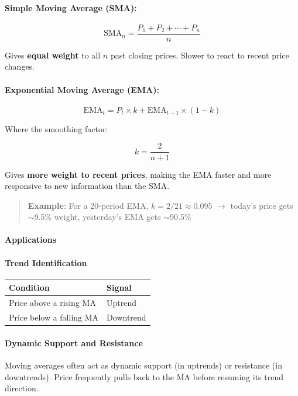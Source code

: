 \documentclass[12pt,openany]{book}
\begin{document}
\paragraph{Simple Moving Average (SMA):}

\[
\text{SMA}_n = \frac{P_1 + P_2 + \cdots + P_n}{n}
\]

Gives \textbf{equal weight} to all \(n\) past closing prices. Slower to react to recent price changes.

\paragraph{Exponential Moving Average (EMA):}

\[
\text{EMA}_t = P_t \times k + \text{EMA}_{t-1} \times (1 - k)
\]

Where the smoothing factor:

\[
k = \frac{2}{n + 1}
\]

Gives \textbf{more weight to recent prices}, making the EMA faster and more responsive to new information than the SMA.

\begin{quote}
\textbf{Example}: For a 20-period EMA, \(k = 2/21 \approx 0.095\) \(\rightarrow\) today's price gets \(\sim\)9.5\% weight, yesterday's EMA gets \(\sim\)90.5\%

\end{quote}
\paragraph{Applications}

\paragraph{Trend Identification}

\begin{center}
\small
\renewcommand{\arraystretch}{1.2}
\begin{tabular}{|L{0.30\textwidth}|L{0.60\textwidth}|}
\hline
 \textbf{Condition} & \textbf{Signal} \\ \hline
 Price above a rising MA & Uptrend \\ \hline
 Price below a falling MA & Downtrend \\ \hline
\end{tabular}
\end{center}

\paragraph{Dynamic Support and Resistance}
Moving averages often act as dynamic support (in uptrends) or resistance (in downtrends). Price frequently pulls back to the MA before resuming its trend direction.
\end{document}
